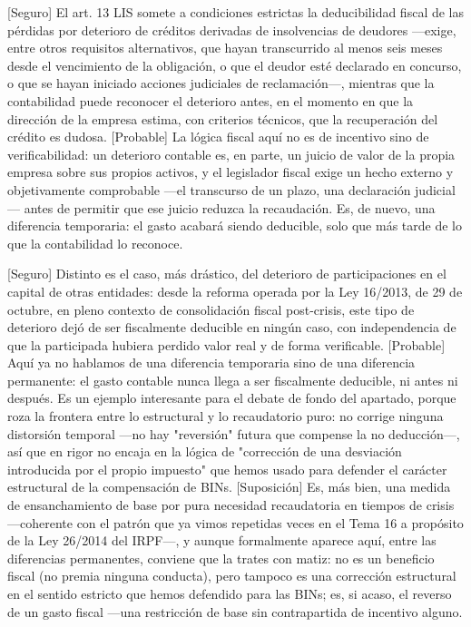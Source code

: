 \documentclass[10pt,a4paper]{article}
\begin{document}
[Seguro] El art. 13 LIS somete a condiciones estrictas la deducibilidad fiscal de las pérdidas por deterioro de créditos derivadas de insolvencias de deudores —exige, entre otros requisitos alternativos, que hayan transcurrido al menos seis meses desde el vencimiento de la obligación, o que el deudor esté declarado en concurso, o que se hayan iniciado acciones judiciales de reclamación—, mientras que la contabilidad puede reconocer el deterioro antes, en el momento en que la dirección de la empresa estima, con criterios técnicos, que la recuperación del crédito es dudosa. [Probable] La lógica fiscal aquí no es de incentivo sino de verificabilidad: un deterioro contable es, en parte, un juicio de valor de la propia empresa sobre sus propios activos, y el legislador fiscal exige un hecho externo y objetivamente comprobable —el transcurso de un plazo, una declaración judicial— antes de permitir que ese juicio reduzca la recaudación. Es, de nuevo, una diferencia temporaria: el gasto acabará siendo deducible, solo que más tarde de lo que la contabilidad lo reconoce.

[Seguro] Distinto es el caso, más drástico, del deterioro de participaciones en el capital de otras entidades: desde la reforma operada por la Ley 16/2013, de 29 de octubre, en pleno contexto de consolidación fiscal post-crisis, este tipo de deterioro dejó de ser fiscalmente deducible en ningún caso, con independencia de que la participada hubiera perdido valor real y de forma verificable. [Probable] Aquí ya no hablamos de una diferencia temporaria sino de una diferencia permanente: el gasto contable nunca llega a ser fiscalmente deducible, ni antes ni después. Es un ejemplo interesante para el debate de fondo del apartado, porque roza la frontera entre lo estructural y lo recaudatorio puro: no corrige ninguna distorsión temporal —no hay "reversión" futura que compense la no deducción—, así que en rigor no encaja en la lógica de "corrección de una desviación introducida por el propio impuesto" que hemos usado para defender el carácter estructural de la compensación de BINs. [Suposición] Es, más bien, una medida de ensanchamiento de base por pura necesidad recaudatoria en tiempos de crisis —coherente con el patrón que ya vimos repetidas veces en el Tema 16 a propósito de la Ley 26/2014 del IRPF—, y aunque formalmente aparece aquí, entre las diferencias permanentes, conviene que la trates con matiz: no es un beneficio fiscal (no premia ninguna conducta), pero tampoco es una corrección estructural en el sentido estricto que hemos defendido para las BINs; es, si acaso, el reverso de un gasto fiscal —una restricción de base sin contrapartida de incentivo alguno.
\end{document}
